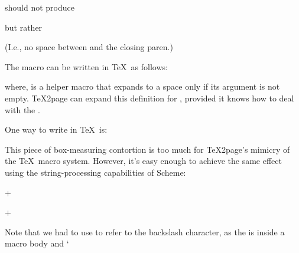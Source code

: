 {{{{{{{{{{{{{{

\n should not produce

\quote


\endquote

\n but rather

\quote


\endquote

\n (I.e., no space between  and the
closing paren.)


The \p{\proto} macro can be written
in \TeX\ as follows:


\n where, \p{\spaceifnotempty} is a helper macro
that expands to a space only if its argument is
not empty.  \TeX2page can expand this definition
for \p{\proto}, provided it knows how to deal
with the \p{\spaceifnotempty}.

One way to write \p{\spaceifnotempty} in \TeX\
is:


\n This piece of box-measuring contortion is
too much for \TeX2page’s mimicry of the \TeX\ macro
system.  However, it’s easy enough to  achieve the
same effect using the string-processing capabilities
of Scheme:

\p+
\ifx\shipout\UnDeFiNeD
\htmlonly


\def\spaceifnotempty{\eval{
+\q{
(let ((x (ungroup (get-token))))
  (if (not (all-blanks? x))
      (begin (display (integer->char 92))
             (display "space"))
      0))
}\p+
}}

\endhtmlonly
\fi
+

\n Note that we had to use  to refer to the
backslash character, as the \p{\eval} is inside a macro body and ‘}}}}}}}}}}}}}}
